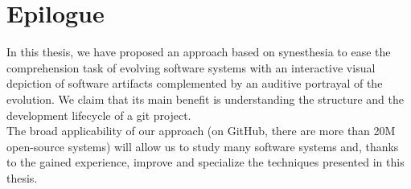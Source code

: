 \section{Epilogue}
In this thesis, we have proposed an approach based on synesthesia to ease the comprehension task of evolving software systems with an interactive visual depiction of software artifacts complemented by an auditive portrayal of the evolution. We claim that its main benefit is understanding the structure and the development lifecycle of a git project. \\
The broad applicability of our approach  (on GitHub, there are more than 20M open-source systems) will allow us to study many software systems and, thanks to the gained experience, improve and specialize the techniques presented in this thesis.  